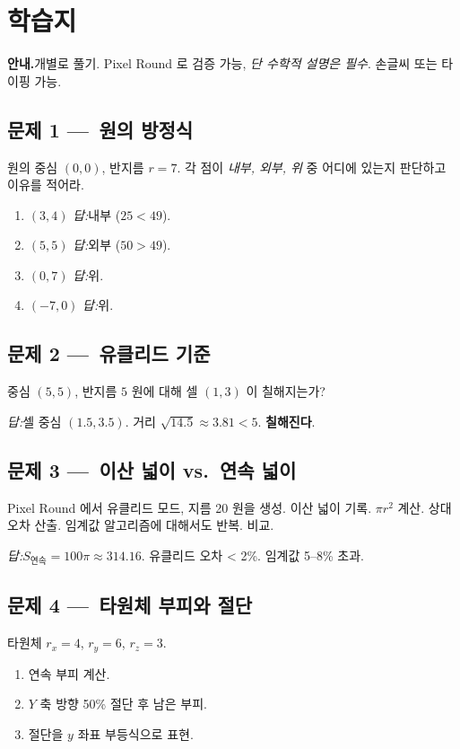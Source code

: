 \documentclass[12pt,a4paper]{scrartcl}
\newcommand{\acc}[1]{\textcolor{accent}{\textbf{#1}}}
\begin{document}
\newpage
\section{학습지}\label{ap:hak}

\textbf{안내.}개별로 풀기. Pixel Round 로 검증 가능, \emph{단 수학적 설명은 필수}. 손글씨 또는 타이핑 가능.

\subsection*{문제 1 ---\, 원의 방정식}
원의 중심 $(0, 0)$, 반지름 $r = 7$. 각 점이 \emph{내부, 외부, 위} 중 어디에 있는지 판단하고 이유를 적어라.
\begin{enumerate}[label=\alph*),leftmargin=1.5em,itemsep=0.1em,topsep=0.2em,nosep]
  \item $(3, 4)$ \hfill \emph{답:}내부 ($25 < 49$).
  \item $(5, 5)$ \hfill \emph{답:}외부 ($50 > 49$).
  \item $(0, 7)$ \hfill \emph{답:}위.
  \item $(-7, 0)$ \hfill \emph{답:}위.
\end{enumerate}

\subsection*{문제 2 ---\, 유클리드 기준}
중심 $(5, 5)$, 반지름 $5$ 원에 대해 셀 $(1, 3)$ 이 칠해지는가?

\emph{답:}셀 중심 $(1.5, 3.5)$. 거리 $\sqrt{14.5} \approx 3.81 < 5$. \acc{칠해진다}.

\subsection*{문제 3 ---\, 이산 넓이 vs.\ 연속 넓이}
Pixel Round 에서 유클리드 모드, 지름 20 원을 생성. 이산 넓이 기록. $\pi r^2$ 계산. 상대 오차 산출. 임계값 알고리즘에 대해서도 반복. 비교.

\emph{답:}$S_{\text{연속}} = 100\pi \approx 314.16$. 유클리드 오차 < 2\%. 임계값 5--8\% 초과.

\subsection*{문제 4 ---\, 타원체 부피와 절단}
타원체 $r_x = 4$, $r_y = 6$, $r_z = 3$.
\begin{enumerate}[label=\alph*),leftmargin=1.5em,itemsep=0.1em,topsep=0.2em,nosep]
  \item 연속 부피 계산.
  \item $Y$ 축 방향 50\% 절단 후 남은 부피.
  \item 절단을 $y$ 좌표 부등식으로 표현.
\end{enumerate}
\end{document}
